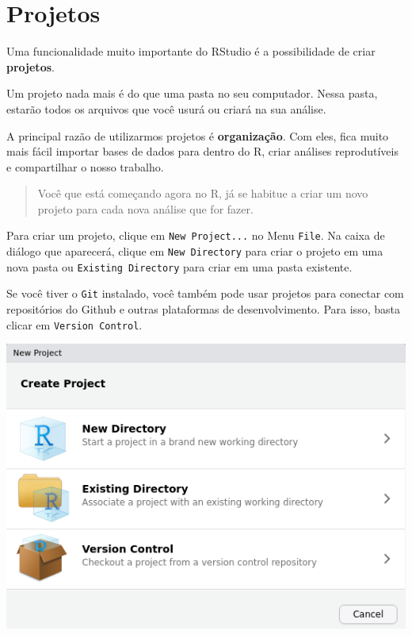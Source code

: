 \documentclass[]{book}
\begin{document}
\hypertarget{projetos}{%
\section{Projetos}\label{projetos}}

Uma funcionalidade muito importante do RStudio é a possibilidade de criar \textbf{projetos}.

Um projeto nada mais é do que uma pasta no seu computador. Nessa pasta, estarão todos os arquivos que você usurá ou criará na sua análise.

A principal razão de utilizarmos projetos é \textbf{organização}. Com eles, fica muito mais fácil importar bases de dados para dentro do R, criar análises reprodutíveis e compartilhar o nosso trabalho.

\begin{quote}
Você que está começando agora no R, já se habitue a criar um novo projeto para cada nova análise que for fazer.
\end{quote}

Para criar um projeto, clique em \texttt{New\ Project...} no Menu \texttt{File}. Na caixa de diálogo que aparecerá, clique em \texttt{New\ Directory} para criar o projeto em uma nova pasta ou \texttt{Existing\ Directory} para criar em uma pasta existente.

Se você tiver o \texttt{Git} instalado, você também pode usar projetos para conectar com repositórios do Github e outras plataformas de desenvolvimento. Para isso, basta clicar em \texttt{Version\ Control}.

\begin{center}\includegraphics[width=7.4in]{img/rstudio/projetos} \end{center}
\end{document}
